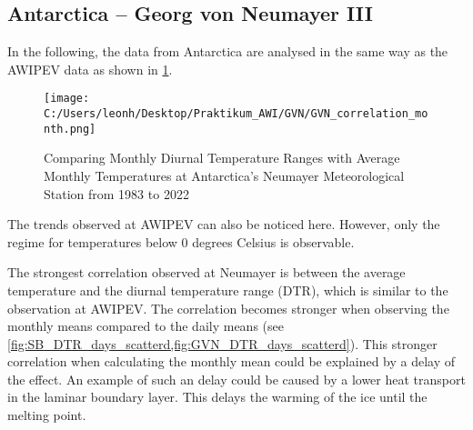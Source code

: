 \subsection*{Antarctica -- Georg von Neumayer III}

In the following, the data from Antarctica are analysed in the same way as the AWIPEV data as shown in \cref{fig:GVN_DTR_Month_scatterd}.

\begin{figure}[h!]
    \centering
    \texttt{[image: C:/Users/leonh/Desktop/Praktikum\_AWI/GVN/GVN\_correlation\_month.png]}
    \caption{Comparing Monthly Diurnal Temperature Ranges with Average Monthly Temperatures at Antarctica's Neumayer Meteorological Station from 1983 to 2022}
    \label{fig:GVN_DTR_Month_scatterd}
\end{figure}

The trends observed at AWIPEV can also be noticed here. However, only the regime for temperatures below 0 degrees Celsius is observable.

The strongest correlation observed at Neumayer is between the average temperature and the diurnal temperature range (DTR), which is similar to the observation at AWIPEV.
The correlation becomes stronger when observing the monthly means compared to the daily means (see \cref{fig:SB_DTR_days_scatterd,fig:GVN_DTR_days_scatterd}).
This stronger correlation when calculating the monthly mean could be explained by a delay of the effect.
An example of such an delay could be caused by a lower heat transport in the laminar boundary layer. This delays the warming of the ice until the melting point.



